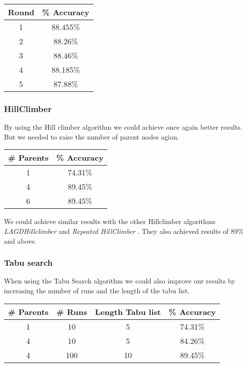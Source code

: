 \documentclass{article}
\begin{document}
\begin{center}
\begin{tabular}{ c | c }
\textbf{Round} & \textbf{\% Accuracy} \\
\hline
1  & 88.455\% \\
2  & 88.26\% \\
3  & 88.46\% \\
4  & 88.185\% \\
5  & 87.88\% \\
\end{tabular}
\end{center}

\subsubsection{HillClimber}
By using the Hill climber algorithm we could achieve once again better results. But we needed to raise the number of parent nodes agian.
\begin{center}
\begin{tabular}{ c | c }
\textbf{\# Parents} & \textbf{\% Accuracy} \\
\hline
1  & 74.31\% \\
4  & 89.45\% \\
6  & 89.45\% \\
\end{tabular}
\end{center}

We could achieve similar results with the other Hillclimber algorithms \emph{LAGDHillclimber} and \emph{Repeated HillClimber} . They also achieved results of 89\% and above.

\subsubsection{Tabu search}
When using the Tabu Search algorithm we could also improve our results by increasing the number of runs and the length of the tabu list.
\begin{center}
\begin{tabular}{ c | c  | c | c }
\textbf{\# Parents} & \textbf{\# Runs} & \textbf{Length Tabu list}  & \textbf{\% Accuracy} \\
\hline
1  & 10 & 5 & 74.31\% \\
4  & 10 & 5 & 84.26\% \\
4  & 100 & 10&  89.45\% \\
\end{tabular}
\end{center}
\end{document}

